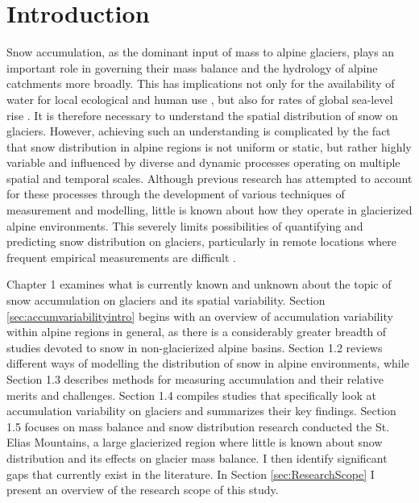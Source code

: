 \documentclass{sfuthesis}
\begin{document}
\tableofcontents\clearpage
{}\listoftables\clearpage
{}\listoffigures






\mainmatter%

\chapter{Introduction}

Snow accumulation, as the dominant input of mass to alpine glaciers, plays an important role in governing their mass balance and the hydrology of alpine catchments more broadly. This has implications not only for the availability of water for local ecological and human use \citep{Barnett2005,ONeel2014}, but also for rates of global sea-level rise \citep{Gardner2013}. It is therefore necessary to understand the spatial distribution of snow on glaciers. However, achieving such an understanding is complicated by the fact that snow distribution in alpine regions is not uniform or static, but rather highly variable and influenced by diverse and dynamic processes operating on multiple spatial and temporal scales. Although previous research has attempted to account for these processes through the development of various techniques of measurement and modelling, little is known about how they operate in glacierized alpine environments. This severely limits possibilities of quantifying and predicting snow distribution on glaciers, particularly in remote locations where frequent empirical measurements are difficult \citep{Nolan2015}.

Chapter 1 examines what is currently known and unknown about the topic of snow accumulation on glaciers and its spatial variability. Section \ref{sec:accumvariabilityintro} begins with an overview of accumulation variability within alpine regions in general, as there is a considerably greater breadth of studies devoted to snow in non-glacierized alpine basins. Section 1.2 reviews different ways of modelling the distribution of snow in alpine environments, while Section 1.3 describes methods for measuring accumulation and their relative merits and challenges. Section 1.4 compiles studies that specifically look at accumulation variability on glaciers and summarizes their key findings. Section 1.5 focuses on mass balance and snow distribution research conducted the St. Elias Mountains, a large glacierized region where little is known about snow distribution and its effects on glacier mass balance. I then identify significant gaps that currently exist in the literature. In Section \ref{sec:ResearchScope} I present an overview of the research scope of this study.
\end{document}
